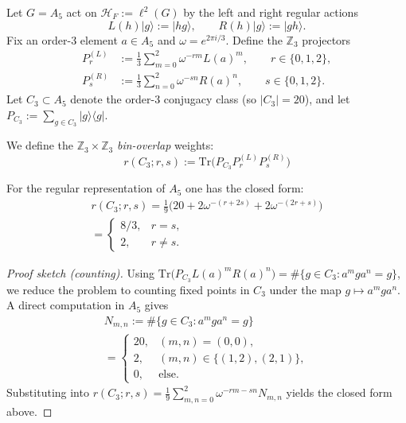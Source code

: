 Let $G = A_5$ act on $\mathcal{H}_F := \ell^2(G)$ by the left and right regular actions
\begin{equation}
L(h)|g\rangle := |hg\rangle, \qquad R(h)|g\rangle := |gh\rangle.
\end{equation}
Fix an order-3 element $a \in A_5$ and $\omega = e^{2\pi i/3}$. Define the $\mathbb{Z}_3$ projectors
\begin{align}
P_r^{(L)} &:= \frac{1}{3}\sum_{m=0}^{2}\omega^{-rm}L(a)^m, \qquad r \in \{0,1,2\}, \\
P_s^{(R)} &:= \frac{1}{3}\sum_{n=0}^{2}\omega^{-sn}R(a)^n, \qquad s \in \{0,1,2\}.
\end{align}
Let $C_3 \subset A_5$ denote the order-3 conjugacy class (so $|C_3| = 20$), and let 
$P_{C_3} := \sum_{g \in C_3}|g\rangle\langle g|$.

We define the $\mathbb{Z}_3 \times \mathbb{Z}_3$ \emph{bin-overlap} weights:
\begin{equation}
\boxed{r(C_3; r, s) := \mathrm{Tr}\big(P_{C_3} P_r^{(L)} P_s^{(R)}\big)}
\end{equation}

\begin{lemma}\label{lem:bin_overlap}
For the regular representation of $A_5$ one has the closed form:
\begin{equation}
\boxed{
\begin{gathered}
r(C_3; r, s) = \frac{1}{9}\Big(20 + 2\omega^{-(r+2s)} + 2\omega^{-(2r+s)}\Big) \\[4pt]
= \begin{cases} 8/3, & r = s, \\ 2, & r \neq s. \end{cases}
\end{gathered}
}
\end{equation}
\end{lemma}

\begin{proof}[Proof sketch (counting)]
Using $\mathrm{Tr}\big(P_{C_3} L(a)^m R(a)^n\big) = \#\{g \in C_3 : a^m g a^n = g\}$, 
we reduce the problem to counting fixed points in $C_3$ under the map $g \mapsto a^m g a^n$.
A direct computation in $A_5$ gives
\begin{equation}
\begin{gathered}
N_{m,n} := \#\{g \in C_3 : a^m g a^n = g\} \\[4pt]
= \begin{cases}
20, & (m,n) = (0,0), \\
2, & (m,n) \in \{(1,2),(2,1)\}, \\
0, & \text{else}.
\end{cases}
\end{gathered}
\end{equation}
Substituting into $r(C_3; r, s) = \frac{1}{9}\sum_{m,n=0}^{2}\omega^{-rm-sn}N_{m,n}$ 
yields the closed form above.
\end{proof}

